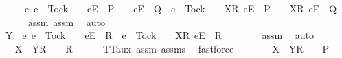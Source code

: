 \begin{isabellebody}
\ \ \ \ {\isasymsubseteq}\ {\isacharbraceleft}e{\isachardot}\ e\ {\isasymnoteq}\ Tock\ {\isasymand}\ {\isasymrho}\ {\isacharat}\ {\isacharbrackleft}{\isacharbrackleft}e{\isacharbrackright}\isactrlsub E{\isacharbrackright}\ {\isasymin}\ P\ {\isasymand}\ {\isasymrho}\ {\isacharat}\ {\isacharbrackleft}{\isacharbrackleft}e{\isacharbrackright}\isactrlsub E{\isacharbrackright}\ {\isasymin}\ Q\ {\isasymor}\ e\ {\isacharequal}\ Tock\ {\isasymand}\ {\isasymrho}\ {\isacharat}\ {\isacharbrackleft}{\isacharbrackleft}X{\isacharbrackright}\isactrlsub R{\isacharcomma}\ {\isacharbrackleft}e{\isacharbrackright}\isactrlsub E{\isacharbrackright}\ {\isasymin}\ P\ {\isasymand}\ {\isasymrho}\ {\isacharat}\ {\isacharbrackleft}{\isacharbrackleft}X{\isacharbrackright}\isactrlsub R{\isacharcomma}\ {\isacharbrackleft}e{\isacharbrackright}\isactrlsub E{\isacharbrackright}\ {\isasymin}\ Q{\isacharbraceright}{\isachardoublequoteclose}\isanewline
\ \ \ \ \isamarkupfalse%
\ assm{}\ assm{}\ \isamarkupfalse%
\ auto\isanewline
\ \ \isamarkupfalse%
\ \isamarkupfalse%
\ {\isachardoublequoteopen}Y\ {\isasyminter}\ {\isacharbraceleft}e{\isachardot}\ e\ {\isasymnoteq}\ Tock\ {\isasymand}\ {\isasymrho}\ {\isacharat}\ {\isacharbrackleft}{\isacharbrackleft}e{\isacharbrackright}\isactrlsub E{\isacharbrackright}\ {\isasymin}\ R\ {\isasymor}\ e\ {\isacharequal}\ Tock\ {\isasymand}\ {\isasymrho}\ {\isacharat}\ {\isacharbrackleft}{\isacharbrackleft}X{\isacharbrackright}\isactrlsub R{\isacharcomma}\ {\isacharbrackleft}e{\isacharbrackright}\isactrlsub E{\isacharbrackright}\ {\isasymin}\ R{\isacharbraceright}\ {\isacharequal}\ {\isacharbraceleft}{\isacharbraceright}{\isachardoublequoteclose}\isanewline
\ \ \ \ \isamarkupfalse%
\ assm{}\ \isamarkupfalse%
\ auto\isanewline
\ \ \isamarkupfalse%
\ \isamarkupfalse%
\ {\isachardoublequoteopen}{\isasymrho}\ {\isacharat}\ {\isacharbrackleft}X\ {\isasymunion}\ Y{\isacharbrackright}\isactrlsub R\ {\isacharhash}\ {\isasymsigma}\ {\isasymin}\ R{\isachardoublequoteclose}\isanewline
\ \ \ \ \isamarkupfalse%
\ TT{}{\isacharunderscore}aux{}\ assm{}\ assms{\isacharparenleft}{}{\isacharparenright}\ \isamarkupfalse%
\ fastforce\isanewline
\ \ \isamarkupfalse%
\ \isamarkupfalse%
\ {\isachardoublequoteopen}{\isasymrho}\ {\isacharat}\ {\isacharbrackleft}X\ {\isasymunion}\ Y{\isacharbrackright}\isactrlsub R\ {\isacharhash}\ {\isasymsigma}\ {\isasymin}\ P{\isachardoublequoteclose}\isanewline

\end{isabellebody}
